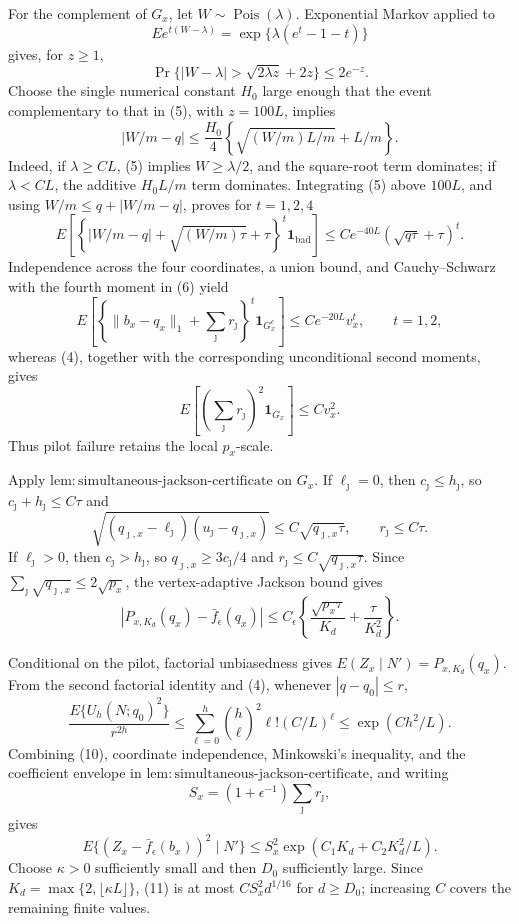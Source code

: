 For the complement of \(G_x\), let \(W\sim\operatorname{Pois}(\lambda)\).  Exponential Markov applied to
\[
 E e^{t(W-\lambda)}=\exp\{\lambda(e^t-1-t)\}
\]
gives, for \(z\geq1\),
\[
 \Pr\{|W-\lambda|>\sqrt{2\lambda z}+2z\}\leq2e^{-z}.            \tag{5}
\]
Choose the single numerical constant \(H_0\) large enough that the event complementary to that in (5), with \(z=100L\), implies
\[
 |W/m-q|\leq\frac{H_0}{4}
 \left\{\sqrt{(W/m)L/m}+L/m\right\}.
\]
Indeed, if \(\lambda\geq CL\), (5) implies \(W\geq\lambda/2\), and the square-root term dominates; if \(\lambda<CL\), the additive \(H_0L/m\) term dominates.  Integrating (5) above \(100L\), and using \(W/m\leq q+|W/m-q|\), proves for \(t=1,2,4\)
\[
 E\!\left[
 \left\{|W/m-q|+\sqrt{(W/m)\tau}+\tau\right\}^t
 \mathbf1_{\mathrm{bad}}\right]
 \leq C e^{-40L}(\sqrt{q\tau}+\tau)^t.                            \tag{6}
\]
Independence across the four coordinates, a union bound, and Cauchy--Schwarz with the fourth moment in (6) yield
\[
 E\!\left[
 \left\{\lVert b_x-q_x\rVert_1+\sum_\jmath r_\jmath\right\}^t
 \mathbf1_{G_x^c}\right]
 \leq C e^{-20L}v_x^t,
 \qquad t=1,2,                                                       \tag{7}
\]
whereas (4), together with the corresponding unconditional second moments, gives
\[
 E\!\left[\left(\sum_\jmath r_\jmath\right)^2\mathbf1_{G_x}\right]
 \leq Cv_x^2.                                                        \tag{8}
\]
Thus pilot failure retains the local \(p_x\)-scale.

Apply \(\mathrm{lem:simultaneous\mbox{-}jackson\mbox{-}certificate}\) on \(G_x\).  If \(\ell_\jmath=0\), then \(c_\jmath\leq h_\jmath\), so \(c_\jmath+h_\jmath\leq C\tau\) and
\[
 \sqrt{(q_{\jmath,x}-\ell_\jmath)(u_\jmath-q_{\jmath,x})}
 \leq C\sqrt{q_{\jmath,x}\tau},
 \qquad r_\jmath\leq C\tau.
\]
If \(\ell_\jmath>0\), then \(c_\jmath>h_\jmath\), so \(q_{\jmath,x}\geq3c_\jmath/4\) and \(r_\jmath\leq C\sqrt{q_{\jmath,x}\tau}\).  Since \(\sum_\jmath\sqrt{q_{\jmath,x}}\leq2\sqrt{p_x}\), the vertex-adaptive Jackson bound gives
\[
 |P_{x,K_d}(q_x)-\bar f_\epsilon(q_x)|
 \leq C_\epsilon\left\{
 \frac{\sqrt{p_x\tau}}{K_d}+\frac{\tau}{K_d^2}\right\}.          \tag{9}
\]

Conditional on the pilot, factorial unbiasedness gives
\(E(Z_x\mid N')=P_{x,K_d}(q_x)\).  From the second factorial identity and (4), whenever \(|q-q_0|\leq r\),
\[
 \frac{E\{U_h(N;q_0)^2\}}{r^{2h}}
 \leq\sum_{\ell=0}^h\binom h\ell^2\ell!(C/L)^\ell
 \leq\exp(Ch^2/L).                                                   \tag{10}
\]
Combining (10), coordinate independence, Minkowski's inequality, and the coefficient envelope in \(\mathrm{lem:simultaneous\mbox{-}jackson\mbox{-}certificate}\), and writing
\[
 S_x=(1+\epsilon^{-1})\sum_\jmath r_\jmath,
\]
gives
\[
 E\{(Z_x-\bar f_\epsilon(b_x))^2\mid N'\}
 \leq S_x^2\exp(C_1K_d+C_2K_d^2/L).                                \tag{11}
\]
Choose \(\kappa>0\) sufficiently small and then \(D_0\) sufficiently large.  Since \(K_d=\max\{2,\lfloor\kappa L\rfloor\}\), (11) is at most \(CS_x^2d^{1/16}\) for \(d\geq D_0\); increasing \(C\) covers the remaining finite values.

